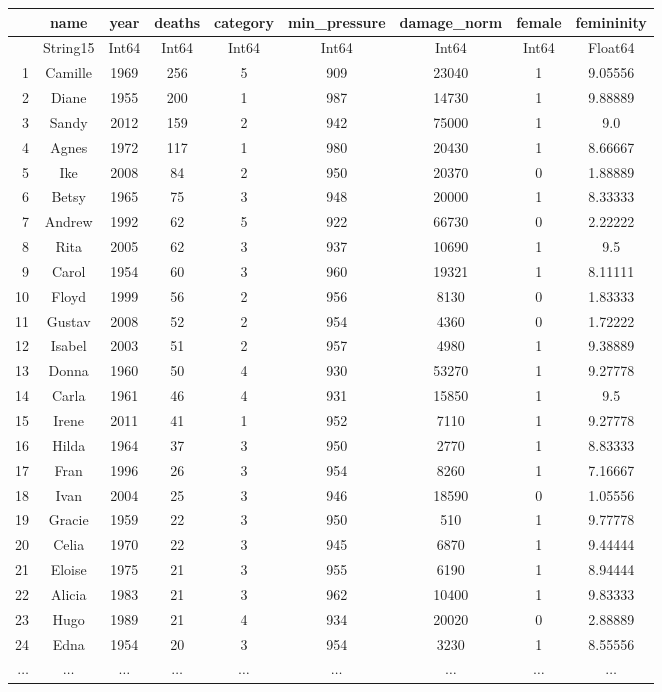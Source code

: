 \documentclass[
  letterpaper,
  DIV=11,
  numbers=noendperiod]{scrartcl}
\begin{document}
\begin{tabular}{r|cccccccc}
    & name & year & deaths & category & min\_pressure & damage\_norm & female & femininity\\
    \hline
    & String15 & Int64 & Int64 & Int64 & Int64 & Int64 & Int64 & Float64\\
    \hline
    1 & Camille & 1969 & 256 & 5 & 909 & 23040 & 1 & 9.05556 \\
    2 & Diane & 1955 & 200 & 1 & 987 & 14730 & 1 & 9.88889 \\
    3 & Sandy & 2012 & 159 & 2 & 942 & 75000 & 1 & 9.0 \\
    4 & Agnes & 1972 & 117 & 1 & 980 & 20430 & 1 & 8.66667 \\
    5 & Ike & 2008 & 84 & 2 & 950 & 20370 & 0 & 1.88889 \\
    6 & Betsy & 1965 & 75 & 3 & 948 & 20000 & 1 & 8.33333 \\
    7 & Andrew & 1992 & 62 & 5 & 922 & 66730 & 0 & 2.22222 \\
    8 & Rita & 2005 & 62 & 3 & 937 & 10690 & 1 & 9.5 \\
    9 & Carol & 1954 & 60 & 3 & 960 & 19321 & 1 & 8.11111 \\
    10 & Floyd & 1999 & 56 & 2 & 956 & 8130 & 0 & 1.83333 \\
    11 & Gustav & 2008 & 52 & 2 & 954 & 4360 & 0 & 1.72222 \\
    12 & Isabel & 2003 & 51 & 2 & 957 & 4980 & 1 & 9.38889 \\
    13 & Donna & 1960 & 50 & 4 & 930 & 53270 & 1 & 9.27778 \\
    14 & Carla & 1961 & 46 & 4 & 931 & 15850 & 1 & 9.5 \\
    15 & Irene & 2011 & 41 & 1 & 952 & 7110 & 1 & 9.27778 \\
    16 & Hilda & 1964 & 37 & 3 & 950 & 2770 & 1 & 8.83333 \\
    17 & Fran & 1996 & 26 & 3 & 954 & 8260 & 1 & 7.16667 \\
    18 & Ivan & 2004 & 25 & 3 & 946 & 18590 & 0 & 1.05556 \\
    19 & Gracie & 1959 & 22 & 3 & 950 & 510 & 1 & 9.77778 \\
    20 & Celia & 1970 & 22 & 3 & 945 & 6870 & 1 & 9.44444 \\
    21 & Eloise & 1975 & 21 & 3 & 955 & 6190 & 1 & 8.94444 \\
    22 & Alicia & 1983 & 21 & 3 & 962 & 10400 & 1 & 9.83333 \\
    23 & Hugo & 1989 & 21 & 4 & 934 & 20020 & 0 & 2.88889 \\
    24 & Edna & 1954 & 20 & 3 & 954 & 3230 & 1 & 8.55556 \\
    $\dots$ & $\dots$ & $\dots$ & $\dots$ & $\dots$ & $\dots$ & $\dots$ & $\dots$ & $\dots$ \\
\end{tabular}
\end{document}
